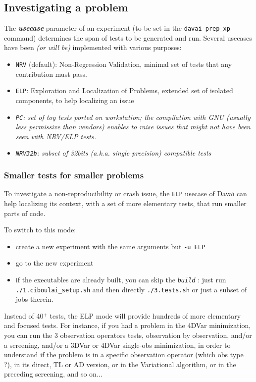 \documentclass[a4paper,10pt,twoside]{article}
\begin{document}
\subsection{\label{sect:investigating}Investigating a problem}

The \textit{\textbf{usecase}} parameter of an experiment (to be set in the \texttt{davai-prep\_xp} command) determines the span of tests to be generated and run. Several usecases have been \textit{(or will be)} implemented with various purposes:
  \begin{itemize}
   \item \texttt{NRV} (default): Non-Regression Validation, minimal set of tests that any contribution must pass.
   \item \texttt{ELP}: Exploration and Localization of Problems, extended set of isolated components, to help localizing an issue
   \item \textit{\texttt{PC}: set of toy tests ported on workstation; the compilation with GNU (usually less permissive than vendors) enables to raise issues that might not have been seen with NRV/ELP tests.}
   \item \textit{\texttt{NRV32b}: subset of 32bits (a.k.a. single precision) compatible tests}
  \end{itemize}

\subsubsection*{Smaller tests for smaller problems}

To investigate a non-reproducibility or crash issue, the \texttt{ELP} usecase of Davaï can help localizing its context, with a set of more elementary tests, that run smaller parts of code.

\noindent To switch to this mode:
\begin{itemize}
 \item create a new experiment with the same arguments but \texttt{-u ELP}
 \item go to the new experiment
 \item if the executables are already built, you can skip the \texttt{\textit{build}} : just run \texttt{./1.ciboulai\_setup.sh} and then directly \texttt{./3.tests.sh} or just a subset of jobs therein.
\end{itemize}

\noindent Instead of 40$^+$ tests, the ELP mode will provide hundreds of more elementary and focused tests. For instance, if you had a problem in the 4DVar minimization, you can run the 3 observation operators tests, observation by observation, and/or a screening, and/or a 3DVar or 4DVar single-obs minimization, in order to understand if the problem is in a specific observation operator (which obs type ?), in its direct, TL or AD version, or in the Variational algorithm, or in the preceding screening, and so on...
\end{document}
